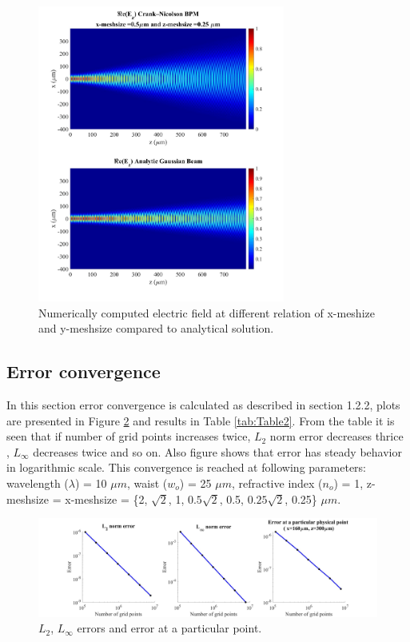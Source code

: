 \documentclass[a4paper]{article}
\begin{document}
	\begin{figure}[H]
		\hspace{-24.5mm}
		\includegraphics[width=0.725\textwidth]{change5.jpg}	
		\caption{\label{fig:Relation} Numerically computed electric field at different relation of x-meshize and y-meshsize compared to analytical solution.}
	\end{figure}
	
	\subsection{Error convergence}
	In this section error convergence is calculated as described in section 1.2.2, plots are presented in Figure \ref{fig:Error} and results in Table \ref{tab:Table2}. From the table it is seen that if number of grid points increases twice, $L_{2}$ norm error decreases thrice , $L_{\infty}$ decreases twice and so on. Also figure shows that error has steady behavior in logarithmic scale. This convergence is reached at following parameters: wavelength ($\lambda$) = 10 $\mu m$, waist ($w_o$) = 25 $\mu m$, refractive index ($n_o$) = 1, z-meshsize = x-meshsize  = \{2, $\sqrt{2}$, 1, $0.5\sqrt{2}$, 0.5, $0.25\sqrt{2}$, 0.25\} $\mu m$.
	\begin{figure}[H]
		\hspace{-30mm}
		\includegraphics[width=1.5\textwidth]{error.jpg}
		\caption{\label{fig:Error} $L_{2}$, $L_{\infty}$ errors and error at a particular point.}
	\end{figure}
	
\end{document}
